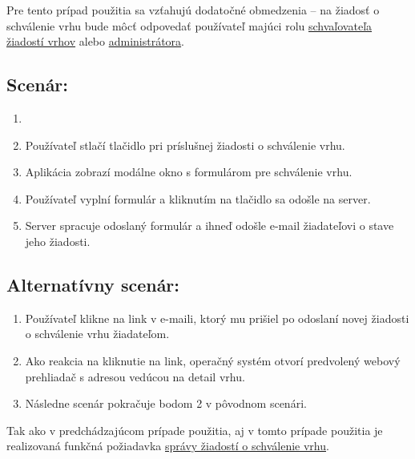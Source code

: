 Pre tento prípad použitia sa vzťahujú dodatočné obmedzenia -- na žiadosť o schválenie vrhu bude môcť odpovedať používateľ majúci rolu \hyperref[schvalovatel-vrhov]{schvaľovateľa žiadostí vrhov} alebo \hyperref[administrator]{administrátora}.

\subsection*{Scenár:}

\begin{enumerate}
	\item {}
	\item Používateľ stlačí tlačidlo  pri príslušnej žiadosti o schválenie vrhu.
	\item Aplikácia zobrazí modálne okno s formulárom pre schválenie vrhu.
	\item Používateľ vyplní formulár a kliknutím na tlačidlo  sa odošle na server.
	\item Server spracuje odoslaný formulár a ihneď odošle e-mail žiadateľovi o stave jeho žiadosti.
\end{enumerate}

\subsection*{Alternatívny scenár:}

\begin{enumerate}
	\item Používateľ klikne na link v e-maili, ktorý mu prišiel po odoslaní novej žiadosti o schválenie vrhu žiadateľom.
	\item Ako reakcia na kliknutie na link, operačný systém otvorí predvolený webový prehliadač s adresou vedúcou na detail vrhu.
	\item Následne scenár pokračuje bodom 2 v pôvodnom scenári.
\end{enumerate}

Tak ako v predchádzajúcom prípade použitia, aj v tomto prípade použitia je realizovaná funkčná požiadavka \hyperref[sprava-ziadosti-o-schvalenie-vrhu]{správy žiadostí o schválenie vrhu}.
	
